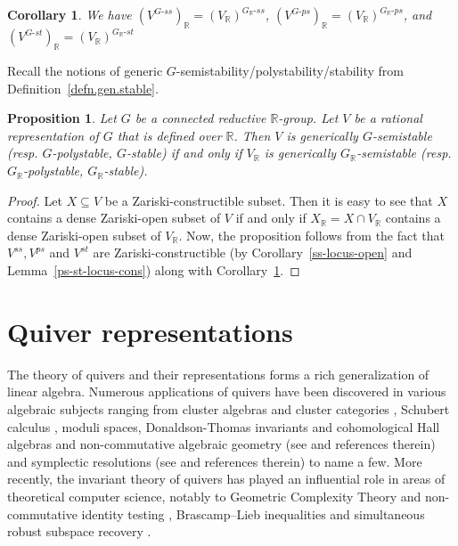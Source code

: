 \documentclass[11pt]{amsart}
\newtheorem{corollary}[theorem]{Corollary}
\newtheorem{proposition}[theorem]{Proposition}
\theoremstyle{definition}
\newcommand{\R}{{\mathbb R}}
\begin{document}
\begin{corollary} \label{cor:transfer}
We have $(V^{G\text{-}ss})_\R = (V_\R)^{G_\R\text{-}ss}$, $(V^{G\text{-}ps})_\R = (V_\R)^{G_\R\text{-}ps}$, and $(V^{G\text{-}st})_\R = (V_\R)^{G_\R\text{-}st}$
\end{corollary}

Recall the notions of generic $G$-semistability/polystability/stability from Definition~\ref{defn.gen.stable}.

\begin{proposition} \label{gen.stable.transfer}
Let $G$ be a connected reductive $\R$-group. Let $V$ be a rational representation of $G$ that is defined over $\R$. Then $V$ is generically $G$-semistable (resp. $G$-polystable, $G$-stable) if and only if $V_\R$ is generically $G_\R$-semistable (resp. $G_\R$-polystable, $G_\R$-stable).
\end{proposition}

\begin{proof}
Let $X \subseteq V$ be a Zariski-constructible subset. Then it is easy to see that $X$ contains a dense Zariski-open subset of $V$ if and only if $X_\R = X \cap V_\R$ contains a dense Zariski-open subset of $V_\R$. Now, the proposition follows from the fact that $V^{ss}, V^{ps}$ and $V^{st}$ are Zariski-constructible (by Corollary~\ref{ss-locus-open} and Lemma~\ref{ps-st-locus-cons}) along with Corollary~\ref{cor:transfer}.
\end{proof}












\section{Quiver representations} \label{sec:quivers}
The theory of quivers and their representations forms a rich generalization of linear algebra. Numerous applications of quivers have been discovered in various algebraic subjects ranging from cluster algebras and cluster categories \cite{DWZ, Keller}, Schubert calculus \cite{DSW, Ressayre,DW-LR}, moduli spaces, Donaldson-Thomas invariants and cohomological Hall algebras and non-commutative algebraic geometry (see \cite{Reineke} and references therein) and symplectic resolutions (see \cite{Ginzburg} and references therein) to name a few. More recently, the invariant theory of quivers has played an influential role in areas of theoretical computer science, notably to Geometric Complexity Theory and non-commutative identity testing \cite{DM,DM-arbchar, GCTV,IQS,IQS2}, Brascamp--Lieb inequalities \cite{GGOW-BL} and simultaneous robust subspace recovery \cite{CK}. 
\end{document}
